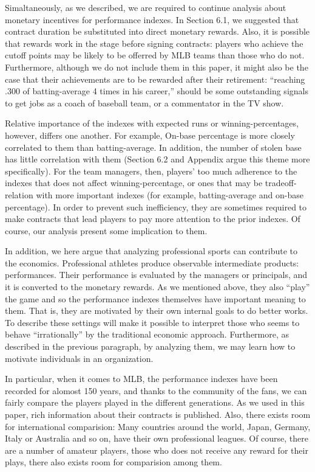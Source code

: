 \documentclass[dvipdfmx, 12pt]{article}
\begin{document}
Simaltaneously, as we described, we are required to continue analysis about monetary incentives for performance indexes. In Section 6.1, we suggested that contract duration be substituted into direct monetary rewards. Also, it is possible that rewards work in the stage before signing contracts: players who achieve the cutoff points may be likely to be offerred by MLB teams than those who do not. Furthermore, although we do not include them in this paper, it might also be the case that their achievements are to be rewarded after their retirement: ``reaching .300 of batting-average 4 times in his career,'' should be some outstanding signals to get jobs as a coach of baseball team, or a commentator in the TV show.

Relative importance of the indexes with expected runs or winning-percentages, however, differs one another. For example, On-base percentage is more closely correlated to them than batting-average. In addition, the number of stolen base has little correlation with them (Section 6.2 and Appendix argue this theme more specifically). For the team managers, then, players' too much adherence to the indexes that does not affect winning-percentage, or ones that may be tradeoff-relation with more important indexes (for example, batting-average and on-base percentage). In order to prevent such inefficiency, they are sometimes required to make contracts that lead players to pay more attention to the prior indexes. Of course, our analysis present some implication to them.

In addition, we here argue that analyzing professional sports can contribute to the economics. Professional athletes produce observable intermediate products: performances. Their performance is evaluated by the managers or principals, and it is converted to the monetary rewards. As we mentioned above, they also ``play'' the game and so the performance indexes themselves have important meaning to them. That is, they are motivated by their own internal goals to do better works. To describe these settings will make it possible to interpret those who seems to behave ``irrationally'' by the traditional economic approach. Furthermore, as described in the previous paragraph, by analyzing them, we may learn how to motivate individuals in an organization.

In particular, when it comes to MLB, the performance indexes have been recorded for alomost 150 years, and thanks to the community of the fans, we can fairly compare the players played in the different generations. As we used in this paper, rich information about their contracts is published. Also, there exists room for international comparision: Many countries around the world, Japan, Germany, Italy or Australia and so on, have their own professional leagues. Of course, there are a number of amateur players, those who does not receive any reward for their plays, there also exists room for comparision among them.
\end{document}
